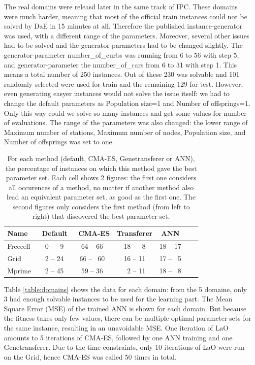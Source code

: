 \documentclass[runningheads,a4paper]{llncs}
\begin{document}
The real domains were releasd later in the same track of IPC. These domains were much harder, meaning that most of the official train instances could not be solved by DaE in 15 minutes at all. Therefore the published instance-generator was used, with a different range of the parameters. Moreover, several other issues had to be solved and the generator-parameters had to be changed slightly. The generator-parameter number\_of\_curbs was running from 6 to 56 with step 5, and generator-parameter the number\_of\_cars from 6 to 31 with step 1. This means a total number of 250 instances. Out of these 230 was solvable and 101 randomly selected were used for train and the remaining 129 for test. However, even generating easyer instances would not solve the issue itself: we had to change the default parameters as Population size=1 and Number of offsprings=1. Only this way could we solve so many instances and get some values for number of evaluations. The range of the parameters was also changed: the lower range of Maximum number of stations, Maximum number of nodes, Population size, and Number of offsprings was set to one.


 \begin{table}[tb!]
\centering
\begin{tabular}{l c c c c c c}
\hline\hline
Name & \ Default & \ CMA-ES &  Transferer & ANN \\ 
\hline
Freecell & ~0 -- ~9& 64 -- 66  & 18 -- ~8  & 18 -- 17     \\
Grid & ~2 -- 24 & 66 -- ~60  & 16 -- 11 & 17 -- ~5  &    \\
Mprime &  ~2 -- 45& 59 -- 36 & ~2 -- 11  & 18 -- ~8  &    \\
\hline
\end{tabular}
\caption{For each method (default, CMA-ES, Genetransferer or ANN), the percentage of instances on which this method gave the best parameter set. Each cell shows 2 figures: the first one considers all occurences of a method, no matter if another method also lead an equivalent parameter set, as good as the first one. The second figures only considers the first method (from left to right) that discovered the best parameter-set.}
\label{table:hints}
\end{table} 


Table \ref{table:domains} shows the data for each domain: from the 5 domaine, only 3 had enough solvable instances to be used for the learning part. The Mean Square Error (MSE) of the trained ANN is shown for each domain. But because the fitness takes only few values, there can be multiple optimal parameter sets for the same instance, resulting in an unavoidable MSE. 
One iteration of LaO amounts to 5 iterations of CMA-ES, followed by one ANN training and one Genetransferer. Due to the time constraints, only 10 iterations of LaO were run on the Grid, hence CMA-ES was called 50 times in total.
\end{document}
